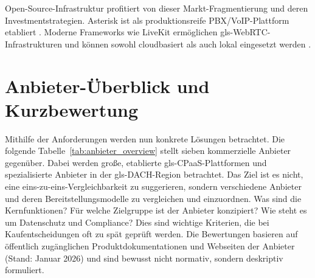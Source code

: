 Open-Source-Infrastruktur profitiert von dieser Markt-Fragmentierung und deren Investmentstrategien. {Asterisk} ist als produktionsreife PBX/VoIP-Plattform etabliert \parencite{asterisk_project}. Moderne Frameworks wie LiveKit ermöglichen \gls{gls-WebRTC}-Infrastrukturen und können sowohl cloudbasiert als auch lokal eingesetzt werden \parencite{livekit_docs}.

\section{Anbieter-Überblick und Kurzbewertung}
Mithilfe der Anforderungen werden nun konkrete Lösungen betrachtet. Die folgende Tabelle~\ref{tab:anbieter_overview} stellt sieben kommerzielle Anbieter gegenüber. Dabei werden gro\ss e, etablierte \gls{gls-CPaaS}-Plattformen und spezialisierte Anbieter in der \gls{gls-DACH}-Region betrachtet. Das Ziel ist es nicht, eine eins-zu-eins-Vergleichbarkeit zu suggerieren, sondern verschiedene Anbieter und deren Bereitstellungsmodelle zu vergleichen und einzuordnen. Was sind die Kernfunktionen? Für welche Zielgruppe ist der Anbieter konzipiert? Wie steht es um Datenschutz und Compliance? Dies sind wichtige Kriterien, die bei Kaufentscheidungen oft zu spät geprüft werden. Die Bewertungen basieren auf öffentlich zugänglichen Produktdokumentationen und
Webseiten der Anbieter (Stand: Januar 2026) und sind bewusst nicht normativ, sondern deskriptiv formuliert.

